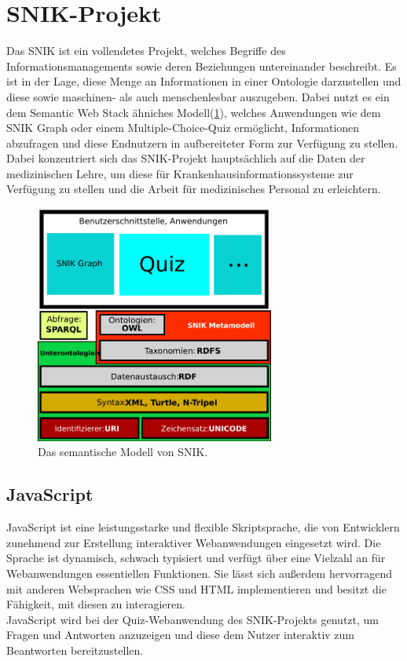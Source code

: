 \documentclass[headsepline,titlepage,ngerman,twoside,12pt]{report}
\begin{document}
\section{\acs{SNIK}-Projekt}
\label{sek:snik}
Das \ac{SNIK} ist ein vollendetes Projekt, welches Begriffe des Informationsmanagements sowie deren Beziehungen untereinander beschreibt.
Es ist in der Lage, diese Menge an Informationen in einer Ontologie darzustellen und diese sowie maschinen- als auch menschenlesbar auszugeben.
 Dabei nutzt es ein dem Semantic Web Stack ähniches Modell(\cref{img:semanticwebstack2}), welches Anwendungen wie dem \ac{SNIK} Graph oder einem Multiple-Choice-Quiz ermöglicht, Informationen abzufragen und diese Endnutzern in aufbereiteter Form zur Verfügung zu stellen.
Dabei konzentriert sich das SNIK-Projekt hauptsächlich auf die Daten der medizinischen Lehre, um diese für Krankenhausinformationssysteme zur Verfügung zu stellen und die Arbeit für medizinisches Personal zu erleichtern.
\begin{figure}
\centering
\includegraphics[width=0.7\textwidth]{images/swebstackde_snik.pdf}
\caption{Das semantische Modell von SNIK.}
\label{img:semanticwebstack2}
\end{figure}

\subsection{JavaScript}
\label{sub:js}
JavaScript ist eine leistungsstarke und flexible Skriptsprache, die von Entwicklern zunehmend zur Erstellung interaktiver Webanwendungen eingesetzt wird.
Die Sprache ist dynamisch, schwach typisiert und verfügt über eine Vielzahl an für Webanwendungen essentiellen Funktionen. 
Sie lässt sich außerdem hervorragend mit anderen Websprachen wie CSS und HTML implementieren und besitzt die Fähigkeit, mit diesen zu interagieren.\\
JavaScript wird bei der Quiz-Webanwendung des SNIK-Projekts genutzt, um Fragen und Antworten anzuzeigen und diese dem Nutzer interaktiv zum Beantworten bereitzustellen.
\end{document}
